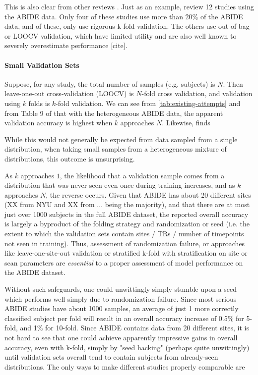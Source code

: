 \documentclass[10pt]{article}
\begin{document}
This is also clear from other reviews \citep[][Table 9]{sakaiMachineLearningStudies2019}. Just as an
example, \citet{sakaiMachineLearningStudies2019} review 12 studies using the ABIDE data. Only four
of these studies use more than 20\% of the ABIDE data, and of these, only
\citet{heinsfeldIdentificationAutismSpectrum2018} use rigorous k-fold validation. The others use
out-of-bag or LOOCV validation, which have limited utility and are also well known to severely
overestimate performance [cite].

\paragraph{Small Validation Sets}

Suppose, for any study, the total number of samples (e.g. subjects) is \(N\). Then leave-one-out
cross-validation (LOOCV) is \(N\)-fold cross validation, and validation using \(k\) folds is
\(k\)-fold validation. We can see from \ref{tab:existing-attempts} and from Table 9 of
\citet{sakaiMachineLearningStudies2019} that with the heterogeneous ABIDE data, the apparent
validation accuracy is highest when \(k\) approaches \(N\). Likewise, \citet{iidakaRestingStateFunctional2015} finds

While this would not generally be expected from data sampled from a single
distribution, when taking small samples from a heterogeneous mixture of distributions, this outcome
is unsurprising.

As \(k\) approaches \(1\), the likelihood that a validation sample comes from a distribution that
was never seen even once during training increases, and as \(k\) approaches \(N\), the reverse
occurs. Given that ABIDE has about 20 different sites (XX from NYU and XX from ... being the
majority), and that there are at most just over 1000 subjects in the full ABIDE dataset, the
reported overall accuracy is largely a byproduct of the folding strategy and randomization or seed
(i.e. the extent to which the validation sets contain sites / TRs / number of timepoints not seen in
training). Thus, assessment of randomization failure, or approaches like leave-one-site-out
validation or stratified k-fold with stratification on site or scan parameters are \emph{essential}
to a proper assessment of model performance on the ABIDE dataset.

Without such safeguards, one could unwittingly simply stumble upon a seed which performs well simply
due to randomization failure. Since most serious ABIDE studies have about 1000 samples, an average
of just 1 more correctly classified subject per fold will result in an overall accuracy increase of
0.5\% for 5-fold, and 1\% for 10-fold. Since ABIDE contains data from 20 different sites, it is not
hard to see that one could achieve apparently impressive gains in overall accuracy, even with
k-fold, simply by "seed hacking" (perhaps quite unwittingly) until validation sets overall tend to
contain subjects from already-seen distributions. The only ways to make different studies properly comparable are
\end{document}
